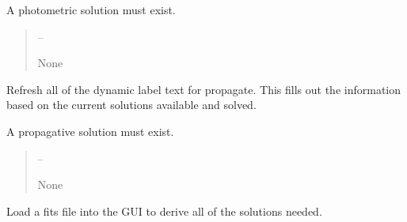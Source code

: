 \documentclass[letterpaper,11pt,english]{sphinxmanual}
\begin{document}
\begin{savenotes}
\begin{fulllineitems}
\begin{savenotes}
\begin{fulllineitems}
\sphinxAtStartPar
A photometric solution must exist.
\begin{quote}\begin{description}
\sphinxAtStartPar
{} – 

\sphinxAtStartPar
None

\end{description}\end{quote}

\end{fulllineitems}\end{savenotes}


\begin{savenotes}\begin{fulllineitems}
\label{\detokenize{code/opihiexarata.gui.manual:opihiexarata.gui.manual.OpihiManualWindow.__refresh_dynamic_label_text_propagate}}
\pysigstartsignatures
{}
\pysigstopsignatures
\sphinxAtStartPar
Refresh all of the dynamic label text for propagate.
This fills out the information based on the current solutions
available and solved.

\sphinxAtStartPar
A propagative solution must exist.
\begin{quote}\begin{description}
\sphinxAtStartPar
{} – 

\sphinxAtStartPar
None

\end{description}\end{quote}

\end{fulllineitems}\end{savenotes}


\begin{savenotes}\begin{fulllineitems}
\label{\detokenize{code/opihiexarata.gui.manual:opihiexarata.gui.manual.OpihiManualWindow._load_fits_file}}
\pysigstartsignatures
{}
\pysigstopsignatures
\sphinxAtStartPar
Load a fits file into the GUI to derive all of the solutions needed.


\end{fulllineitems}
\end{savenotes}
\end{fulllineitems}
\end{savenotes}
\end{document}
